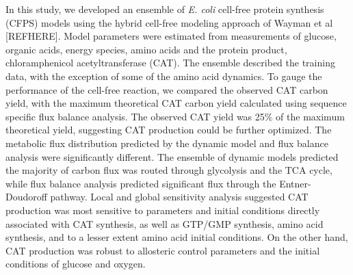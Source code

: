\documentclass[12pt]{article}
\begin{document}
In this study, we developed an ensemble of \textit{E. coli} cell-free protein synthesis (CFPS) models using the hybrid cell-free modeling approach of Wayman et al [REFHERE].
Model parameters were estimated from measurements of glucose, organic acids, energy species, amino acids and the protein product, chloramphenicol acetyltransferase (CAT).
The ensemble described the training data, with the exception of some of the amino acid dynamics.
To gauge the performance of the cell-free reaction, we compared the observed CAT carbon yield, with the maximum theoretical CAT carbon yield calculated using sequence specific flux
balance analysis. The observed CAT yield was 25\% of the maximum theoretical yield, suggesting CAT production could be further optimized.
The metabolic flux distribution predicted by the dynamic model and flux balance analysis were significantly different.
The ensemble of dynamic models predicted the majority of carbon flux was routed through glycolysis and the TCA cycle,
while flux balance analysis predicted significant flux through the Entner-Doudoroff pathway.
Local and global sensitivity analysis suggested CAT production was most sensitive to parameters and initial conditions directly associated with CAT synthesis, as well as
GTP/GMP synthesis, amino acid synthesis, and to a lesser extent amino acid initial conditions.
On the other hand, CAT production was robust to allosteric control parameters and the initial conditions of glucose and oxygen.
\end{document}
